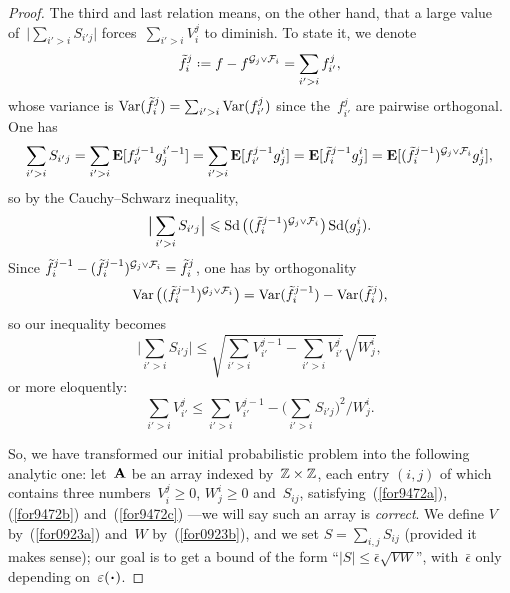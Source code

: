 \begin{proof}
The third and last relation means, on the other hand,
that a large value of~$\big|\sum_{i'>i} S_{i'j}\big|$ forces~$\sum_{i'>i} V_i^j$ to diminish.
To state it, we denote
\[ \tilde{f}^j_i \coloneqq f - f^{\mcal{G}_j\vee\mcal{F}_i}
= \sum_{i'>i} f^j_{i'} ,\]
whose variance is $\Var(\tilde{f}^j_i) = \sum_{i'>i} \Var(f_{i'}^j)$
since the~$f_{i'}^j$ are pairwise orthogonal.
One has
\[ \sum_{i'>i} S_{i'j} = \sum_{i'>i} \EE[f_{i'}^{j-1} g_j^{i'-1}]
= \sum_{i'>i} \EE [ f_{i'}^{j-1} g_j^i ] = \EE[\tilde{f}_i^{j-1} g_j^i]
= \EE[(\tilde{f}_i^{j-1})^{\mcal{G}_j\vee\mcal{F}_i} g_j^i] , \]
so by the Cauchy--Schwarz inequality,
\[ \Big| \sum_{i'>i} S_{i'j} \Big| \leq
\ecty\big((\tilde{f}^{j-1}_i)^{\mcal{G}_j\vee\mcal{F}_i}\big) \ecty(g_j^i) .\]
Since $\tilde{f}^{j-1}_i - (\tilde{f}^{j-1}_i)^{\mcal{G}_j\vee\mcal{F}_i} = \tilde{f}^j_i$,
one has by orthogonality
\[ \Var\big((\tilde{f}^{j-1}_i)^{\mcal{G}_j\vee\mcal{F}_i}\big) =
\Var(\tilde{f}^{j-1}_i) - \Var(\tilde{f}^j_i) ,\]
so our inequality becomes
\[\label{for9472c}
\Big| \sum_{i'>i} S_{i'j} \Big| \leq
\sqrt{\sum_{i'>i} V_{i'}^{j-1} - \sum_{i'>i} V_{i'}^j} \sqrt{W_j^i} ,\]
or more eloquently:
\[\label{for9472c'} \sum_{i'>i} V_{i'}^j \leq
\sum_{i'>i} V_{i'}^{j-1} - \Big( \sum_{i'>i} S_{i'j} \Big)^{\!2} \mathbin{\Big/} W_j^i .\]

So, we have transformed our initial probabilistic problem into the following analytic one:
let~$\mathbf{A}$ be an array indexed by~$\mathbb{Z}\times\mathbb{Z}$,
each entry $(i,j)$ of which contains three numbers~$V_i^j\geq 0$, $W_j^i\geq 0$ and~$S_{ij}$,
satisfying~(\ref{for9472a}), (\ref{for9472b}) and~(\ref{for9472c})%
—we will say such an array is \emph{correct}.
We define $V$ by~(\ref{for0923a}) and~$W$ by~(\ref{for0923b}),
and we set $S = \sum_{i,j} S_{ij}$ (provided it makes sense);
our goal is to get a bound of the form
``$|S| \leq \bar{\epsilon}\sqrt{VW}$'',
with~$\bar{\epsilon}$ only depending on~$\epsilon(\Bcdot)$.


\end{proof}
